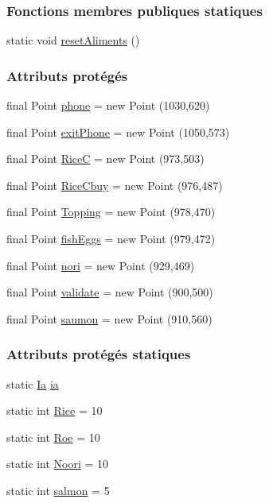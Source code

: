 \subsubsection*{Fonctions membres publiques statiques}
\begin{DoxyCompactItemize}
\item 
static void \hyperlink{classSuchi_1_1Recette_a99446c824f7bffe26c36e8433a4b18b3}{reset\+Aliments} ()
\end{DoxyCompactItemize}
\subsubsection*{Attributs protégés}
\begin{DoxyCompactItemize}
\item 
final Point \hyperlink{classSuchi_1_1Recette_a89465932bd180079526cfc1f8b8af456}{phone} = new Point (1030,620)
\item 
final Point \hyperlink{classSuchi_1_1Recette_ac7ff51ea8fa06174c38c52121b0ef767}{exit\+Phone} = new Point (1050,573)
\item 
final Point \hyperlink{classSuchi_1_1Recette_a36ec8dc3a30b3f1dba74d3aa354f9f11}{Rice\+C} = new Point (973,503)
\item 
final Point \hyperlink{classSuchi_1_1Recette_afc63b1a3fa7d921d606dc0c99d52cdf4}{Rice\+Cbuy} = new Point (976,487)
\item 
final Point \hyperlink{classSuchi_1_1Recette_a4810b2254c050209fba27757066668b3}{Topping} = new Point (978,470)
\item 
final Point \hyperlink{classSuchi_1_1Recette_a9d19fcc0de54e124694592bc35d97a1d}{fish\+Eggs} = new Point (979,472)
\item 
final Point \hyperlink{classSuchi_1_1Recette_ab86193f9fe4491190e232c4e7f93bed5}{nori} = new Point (929,469)
\item 
final Point \hyperlink{classSuchi_1_1Recette_aff16265c9b0b819091af71f64ef84be7}{validate} = new Point (900,500)
\item 
final Point \hyperlink{classSuchi_1_1Recette_a17aeabd21e3d4d55d7caae9a40bfc6a1}{saumon} = new Point (910,560)
\end{DoxyCompactItemize}
\subsubsection*{Attributs protégés statiques}
\begin{DoxyCompactItemize}
\item 
static \hyperlink{classSuchi_1_1Ia}{Ia} \hyperlink{classSuchi_1_1Recette_add9d95ee8955e02592b553c7e4b719a0}{ia}
\item 
static int \hyperlink{classSuchi_1_1Recette_aaac1f0109e823e134f01b16a93ed1596}{Rice} = 10
\item 
static int \hyperlink{classSuchi_1_1Recette_acee61a97ab7dd56b74e2ef3decb5f3c4}{Roe} = 10
\item 
static int \hyperlink{classSuchi_1_1Recette_a439267eba8513fc652f470aa22302e1d}{Noori} = 10
\item 
static int \hyperlink{classSuchi_1_1Recette_a2e9711072decb1bd2a64a4328e566d73}{salmon} = 5
\end{DoxyCompactItemize}


